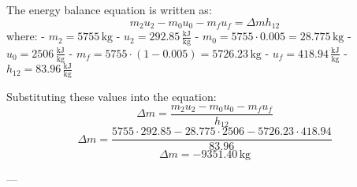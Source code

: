 The energy balance equation is written as:  
\[
m_2 u_2 - m_0 u_0 - m_f u_f = \Delta m h_{12}
\]  
where:  
- \( m_2 = 5755 \, \text{kg} \)  
- \( u_2 = 292.85 \, \frac{\text{kJ}}{\text{kg}} \)  
- \( m_0 = 5755 \cdot 0.005 = 28.775 \, \text{kg} \)  
- \( u_0 = 2506 \, \frac{\text{kJ}}{\text{kg}} \)  
- \( m_f = 5755 \cdot (1 - 0.005) = 5726.23 \, \text{kg} \)  
- \( u_f = 418.94 \, \frac{\text{kJ}}{\text{kg}} \)  
- \( h_{12} = 83.96 \, \frac{\text{kJ}}{\text{kg}} \)  

Substituting these values into the equation:  
\[
\Delta m = \frac{m_2 u_2 - m_0 u_0 - m_f u_f}{h_{12}}
\]  
\[
\Delta m = \frac{5755 \cdot 292.85 - 28.775 \cdot 2506 - 5726.23 \cdot 418.94}{83.96}
\]  
\[
\Delta m = -9351.40 \, \text{kg}
\]  

---